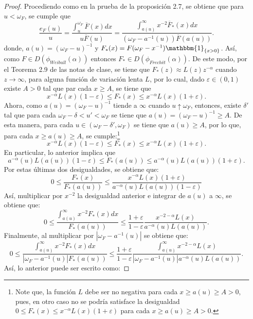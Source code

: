 \documentclass[10.5pt,notitlepage]{article}
\newcommand{\ee}{\varepsilon}
\newcommand{\abs}[1]{\left\lvert #1 \right\rvert}
\newcommand{\kis}[1]{\left\{ #1 \right\}}
\theoremstyle{plain}
\begin{document}
\begin{proof}
Procediendo como en la prueba de la proposición 2.7, se obtiene que para \(u < \omega_{F}\), se cumple que 
\begin{equation}\label{alakk}
    \frac{e_{F}(u)}{u}=\frac{\int_{u}^{\omega_F}\overline{F}(x)dx}{u \overline{F}(u)} = \frac{\int_{a(u)}^{\infty}x^{-2}\overline{F}_{*}(x)dx}{(\omega_{F} - a^{-1}(u)) \overline{F}(a(u))}.
\end{equation}
donde, \(a(u) = (\omega_{F} - u)^{-1}\) y \(F_{*}(x) = F(\omega_{F} - x^{-1})\mathbbm{1}_{\kis{x > 0}}\). Así, como \(F \in D(\phi_{Weibull}(\alpha))\) entonces \(F_{*} \in D(\phi_{Frechét}(\alpha))\). De este modo, por el Teorema 2.9 de las notas de clase, se tiene que \(F_{*}(z) \approx L(z)z^{-\alpha}\) cuando \(z\to \infty\), para alguna función de variación lenta \(L\), por lo cual, dado \(\ee \in(0,1)\) existe \(A >0 \) tal que par cada \(x \geq A\), se tiene que 
\[
x^{-\alpha}L(x)( 1 - \ee) \leq F_{*}(x) \leq x^{-\alpha}L(x)(1 + \ee).
\]
Ahora, como \(a(u) = (\omega_{F} - u)^{-1}\) tiende a \(\infty\) cuando \(u\uparrow \omega_{F}\), entonces, existe \(\delta'\) tal que para cada \( \omega_{F} -\delta<u' < \omega_F\) se tiene que 
\(a(u) = (\omega_{F} - u)^{-1} \geq A\). De esta manera, para cada \(u \in (\omega_{F} -\delta',\omega_{F})\) se tiene que \(a(u) \geq A\), por lo que, para cada \(x \geq a(u) \geq A\),  se cumple:\footnote{Note que, la función \(L\) debe ser no negativa para cada \(x \geq a(u) \geq A > 0\), pues, en otro caso no se podría satisface la desigualdad \(0 \leq F_{*}(x) \leq x^{-\alpha}L(x)(1 + \ee)\) para cada  \(x \geq a(u) \geq A > 0\).} 
\[
x^{-\alpha}L(x)( 1 - \ee) \leq F_{*}(x) \leq x^{-\alpha}L(x)(1 + \ee).
\]
En particular, lo anterior implica que 
\[
a^{-\alpha}(u)L(a(u))( 1 - \ee) \leq F_{*}(a(u)) \leq a^{-\alpha}(u)L(a(u))(1 + \ee).
\]
Por estas últimas dos desigualdades, se obtiene que:
\[
0 \leq  \frac{F_{*}(x)}{ F_{*}(a(u))} \leq \frac{x^{-\alpha}L(x)(1 + \ee)}{a^{-\alpha}(u)L(a(u))( 1 - \ee)}
\]
Así, multiplicar por \(x^{-2}\) la desigualdad anterior e integrar de \(a(u)\) a \(\infty\), se obtiene que:
\[
0\leq \frac{\int_{a(u)}^{\infty}x^{-2}F_{*}(x)dx}{ F_{*}(a(u))}  \leq \frac{1 +\ee}{1-\ee}\frac{x^{-2-\alpha}L(x)}{a^{-\alpha}(u)L(a(u))}.
\]
Finalmente, al multiplicar por \(\abs{\omega_{F} - a^{-1}(u)}\) se obtiene que:
\[
0\leq \frac{\int_{a(u)}^{\infty}x^{-2}F_{*}(x)dx}{ \abs{\omega_{F} - a^{-1}(u)}F_{*}(a(u))}  \leq \frac{1 +\ee}{1-\ee}\frac{\int_{a(u)}^{\infty}x^{-2-\alpha}L(x)}{\abs{\omega_{F} - a^{-1}(u)}a^{-\alpha}(u)L(a(u))}.
\]
Así, lo anterior puede ser escrito como: 

\end{proof}
\end{document}
